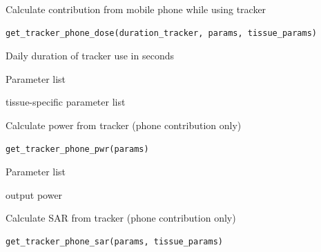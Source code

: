 \documentclass[a4paper]{book}
\begin{document}
%
\begin{Description}
Calculate contribution from mobile phone while using tracker
\end{Description}
%
\begin{Usage}
\begin{verbatim}
get_tracker_phone_dose(duration_tracker, params, tissue_params)
\end{verbatim}
\end{Usage}
%
\begin{Arguments}
\begin{ldescription}
\item[\code{duration\_tracker}] Daily duration of tracker use in seconds

\item[\code{params}] Parameter list

\item[\code{tissue\_params}] tissue-specific parameter list
\end{ldescription}
\end{Arguments}
%
\begin{Description}
Calculate power from tracker (phone contribution only)
\end{Description}
%
\begin{Usage}
\begin{verbatim}
get_tracker_phone_pwr(params)
\end{verbatim}
\end{Usage}
%
\begin{Arguments}
\begin{ldescription}
\item[\code{params}] Parameter list
\end{ldescription}
\end{Arguments}
%
\begin{Value}
output power
\end{Value}
%
\begin{Description}
Calculate SAR from tracker (phone contribution only)
\end{Description}
%
\begin{Usage}
\begin{verbatim}
get_tracker_phone_sar(params, tissue_params)
\end{verbatim}
\end{Usage}
\end{document}
